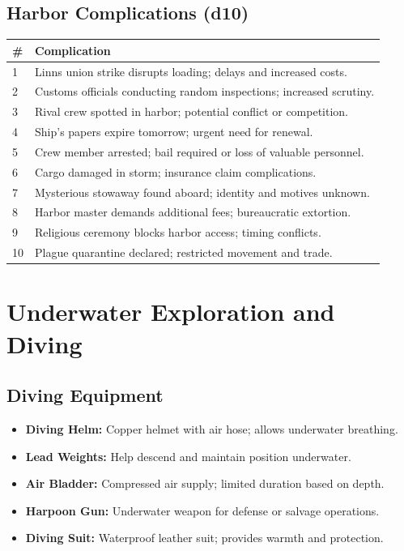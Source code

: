 \documentclass[11pt,oneside]{book}
\begin{document}
\begin{itemize}
\subsection*{Harbor Complications (d10)}
\begin{tabularx}{\linewidth}{@{}p{0.7cm} X@{}}
\toprule
\# & \textbf{Complication}\\
\midrule
1 & Linns union strike disrupts loading; delays and increased costs.\\
2 & Customs officials conducting random inspections; increased scrutiny.\\
3 & Rival crew spotted in harbor; potential conflict or competition.\\
4 & Ship's papers expire tomorrow; urgent need for renewal.\\
5 & Crew member arrested; bail required or loss of valuable personnel.\\
6 & Cargo damaged in storm; insurance claim complications.\\
7 & Mysterious stowaway found aboard; identity and motives unknown.\\
8 & Harbor master demands additional fees; bureaucratic extortion.\\
9 & Religious ceremony blocks harbor access; timing conflicts.\\
10 & Plague quarantine declared; restricted movement and trade.\\
\bottomrule
\end{tabularx}

\section{Underwater Exploration and Diving}

\subsection*{Diving Equipment}
\begin{itemize}
  \item \textbf{Diving Helm:} Copper helmet with air hose; allows underwater breathing.
  \item \textbf{Lead Weights:} Help descend and maintain position underwater.
  \item \textbf{Air Bladder:} Compressed air supply; limited duration based on depth.
  \item \textbf{Harpoon Gun:} Underwater weapon for defense or salvage operations.
  \item \textbf{Diving Suit:} Waterproof leather suit; provides warmth and protection.
\end{itemize}


\end{itemize}
\end{document}
